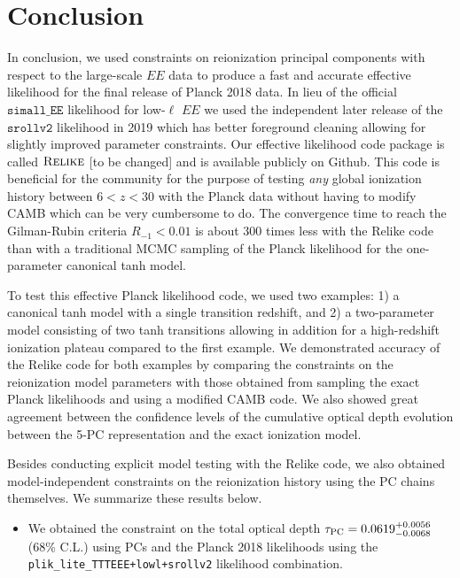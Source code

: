 \documentclass[prd,twocolumn,amsmath,amssymb,floatfix,superscriptaddress,nofootinbib]{revtex4-1}
\begin{document}
{\section{Conclusion}
\label{sec:conclusion}

In conclusion, we used constraints on reionization principal components with respect to the large-scale $EE$ data to produce a fast and accurate effective likelihood for the final release of Planck 2018 data. In lieu of the official $\texttt{simall\_EE}$ likelihood for low-$\ell$ $EE$ we used the independent later release of the $\texttt{srollv2}$ likelihood in 2019 which has better foreground cleaning allowing for slightly improved parameter constraints. Our effective likelihood code package is called $\textsc{Relike}$ [to be changed] and is available publicly on Github. This code is beneficial for the community for the purpose of testing \textit{any} global ionization history between $6 < z < 30$ with the Planck data without having to modify CAMB which can be very cumbersome to do. The convergence time to reach the Gilman-Rubin criteria $R_{-1} < 0.01$ is about 300 times less with the Relike code than with a traditional MCMC sampling of the Planck likelihood for the one-parameter canonical tanh model. 

To test this effective Planck likelihood code, we used two examples: 1) a canonical tanh model with a single transition redshift, and 2) a two-parameter model consisting of two tanh transitions allowing in addition for a high-redshift ionization plateau compared to the first example. We demonstrated accuracy of the Relike code for both examples by comparing the constraints on the reionization model parameters with those obtained from sampling the exact Planck likelihoods and using a modified CAMB code. We also showed great agreement between the confidence levels of the cumulative optical depth evolution between the 5-PC representation and the exact ionization model.

Besides conducting explicit model testing with the Relike code, we also obtained model-independent constraints on the reionization history using the PC chains themselves. We summarize these results below.

\begin{itemize}

    \item {We obtained the constraint on the total optical depth $\tau_{\rm PC} = 0.0619^{+0.0056}_{-0.0068}$ (68\% C.L.) 
    using PCs and the Planck 2018 likelihoods using the \texttt{plik\_lite\_TTTEEE+lowl+srollv2} likelihood combination.}
    

\end{itemize}}
\end{document}
